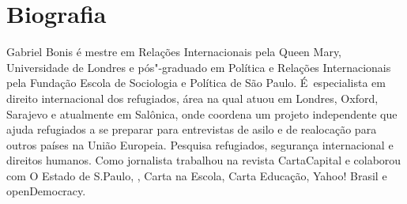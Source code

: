\section{Biografia}

Gabriel Bonis é mestre em Relações Internacionais pela Queen Mary,
Universidade de Londres e pós"-graduado em Política e Relações
Internacionais pela Fundação Escola de Sociologia e Política de São
Paulo. É~especialista em direito internacional dos refugiados, área na
qual atuou em Londres, Oxford, Sarajevo e atualmente em Salônica, onde coordena um projeto independente que ajuda refugiados a se preparar para entrevistas de asilo e de realocação para outros países na União Europeia.  Pesquisa refugiados, segurança internacional e direitos humanos. Como
% 
% 
% 
jornalista trabalhou na revista CartaCapital e colaborou com O Estado de
S.Paulo, , Carta na Escola, Carta Educação, Yahoo! Brasil e
openDemocracy.


